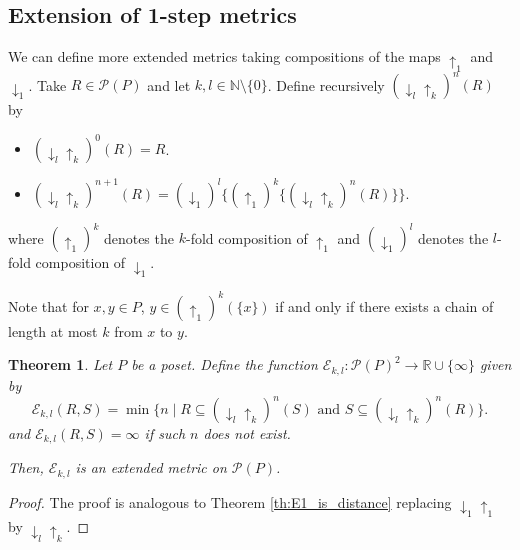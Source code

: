 \documentclass{article}[12pt]
\theoremstyle{exampstyle}
\newtheorem{theorem}{Theorem}[section]
\newtheorem{definition}[theorem]{Definition}
\theoremstyle{remark}
\newcommand{\N}{\mathbb{N}}
\newcommand{\R}{\mathbb{R}}
\newcommand{\B}{\mathcal{B}}
\newcommand{\E}{\mathcal{E}}
\renewcommand{\P}{\mathcal{P}}
\newcommand{\updown}[1][]{\downarrow_{#1} \uparrow_{#1}}
\newcommand{\End}{\text{End}}
\begin{document}


\subsection{Extension of 1-step metrics}



We can define more extended metrics taking compositions of the maps $\uparrow_1$ and $\downarrow_1$. Take $R \in \P(P)$ and let  $k,l \in \N \setminus \{0\}$. Define recursively $(\downarrow_l \uparrow_k)^n (R)$ by 
\begin{itemize}
    \item $(\downarrow_l \uparrow_k)^0(R) = R$.
    \item $(\downarrow_l \uparrow_k)^{n+1}(R) = (\downarrow_1)^l \big\{ (\uparrow_1)^k \{(\downarrow_l \uparrow_k)^{n}(R) \}\big\}$.
\end{itemize}

where $(\uparrow_1)^k$ denotes the $k$-fold composition of $\uparrow_1$ and $(\downarrow_1)^l$ denotes the $l$-fold composition of $\downarrow_1$.

Note that for $x,y \in P$, $y \in (\uparrow_1)^k(\{x\})$ if and only if there exists a chain of length at most $k$ from $x$ to $y$.

\begin{theorem}
        Let $P$ be a poset. Define the function $\E_{k,l}: \P(P)^ 2 \to \R \cup \{ \infty\}$ given by 
            \begin{equation*}
                \E_{k,l}(R,S) = \min \{ n \mid R \subseteq (\downarrow_l \uparrow_k)^{n} (S) \text{ and } S \subseteq (\downarrow_l \uparrow_k)^{n} (R) \}.
            \end{equation*}
            and $\E_{k,l}(R,S) = \infty$ if such $n$ does not exist.

        Then, $\E_{k,l}$ is an extended metric on $\P(P)$.
\end{theorem}
\begin{proof}
    The proof is analogous to Theorem \ref{th:E1_is_distance} replacing $\updown[1]$ by $\downarrow_l \uparrow_k$.
\end{proof}
\end{document}
